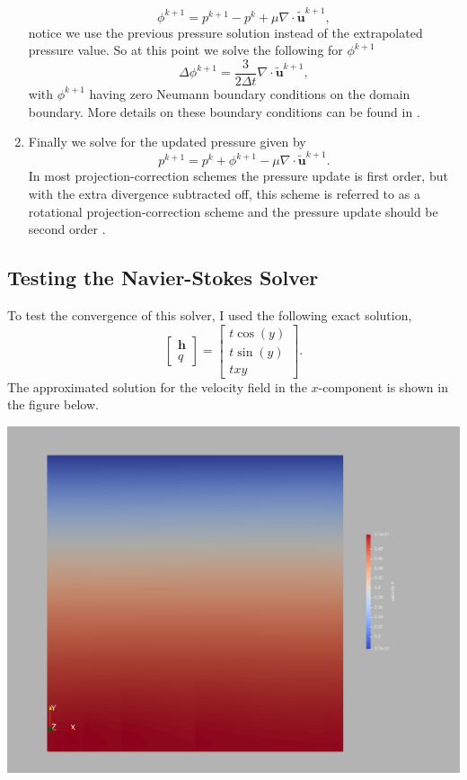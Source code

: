 \documentclass{article}
\begin{document}
\begin{enumerate}
           \[
               \phi^{k+1} = p^{k+1} - p^k +\mu \nabla \cdot \tilde{\boldsymbol{u}}^{k+1},
           \]
           notice we use the previous pressure solution instead of the extrapolated pressure value. So at this point we solve the following for $\phi^{k+1}$
           \[
               \Delta \phi^{k+1} = \frac{3}{2\Delta t}\nabla \cdot \tilde{\boldsymbol{u}}^{k+1} ,
           \]
           with $\phi^{k+1}$ having zero Neumann boundary conditions on the domain boundary. More details on these boundary conditions can be found in \cite{timmerman}.
       \item Finally we solve for the updated pressure given by
           \[
               p^{k+1} = p^k + \phi^{k+1} - \mu \nabla \cdot \tilde{\boldsymbol{u}}^{k+1}.
           \]
           In most projection-correction schemes the pressure update is first order, but with the extra divergence subtracted off, this scheme is referred to as a rotational projection-correction scheme and the pressure update should be second order \cite{rotational}.
   \end{enumerate}

   \subsection*{Testing the Navier-Stokes Solver}

            To test the convergence of this solver, I used the following exact solution,
            \[ \begin{bmatrix} \boldsymbol{h} \\ q\end{bmatrix} = \begin{bmatrix} t \cos(y) \\ t \sin(y) \\ txy \end{bmatrix}.\]
                The approximated solution for the velocity field in the $x$-component is shown in the figure below.

                \begin{center}
                \includegraphics[scale=.2]{vel_x.png}
                \end{center}
\end{document}
